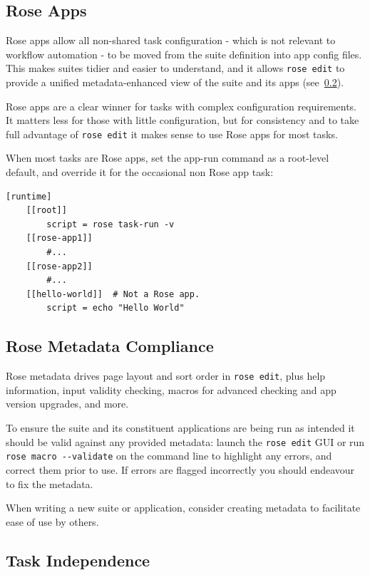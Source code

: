 \subsection{Rose Apps}

Rose apps allow all non-shared task configuration - which is not relevant to
workflow automation - to be moved from the suite definition into app config
files. This makes suites tidier and easier to understand, and it allows
\lstinline=rose edit= to provide a unified metadata-enhanced view of the suite
and its apps (see~\ref{Rose Metadata Compliance}).

Rose apps are a clear winner for tasks with complex configuration requirements.
It matters less for those with little configuration, but for consistency and to
take full advantage of \lstinline=rose edit= it makes sense to use Rose apps
for most tasks.

When most tasks are Rose apps, set the app-run command as a root-level default,
and override it for the occasional non Rose app task:

\lstset{language=suiterc}
\begin{lstlisting}
[runtime]
    [[root]]
        script = rose task-run -v
    [[rose-app1]]
        #...
    [[rose-app2]]
        #...
    [[hello-world]]  # Not a Rose app.
        script = echo "Hello World"
\end{lstlisting}

\subsection{Rose Metadata Compliance}
\label{Rose Metadata Compliance}
 
Rose metadata drives page layout and sort order in \lstinline=rose edit=, plus
help information, input validity checking, macros for advanced checking and app
version upgrades, and more.

To ensure the suite and its constituent applications are being run as intended
it should be valid against any provided metadata: launch the
\lstinline=rose edit= GUI or run \lstinline=rose macro --validate= on the
command line to highlight any errors, and correct them prior to use. If errors
are flagged incorrectly you should endeavour to fix the metadata.

When writing a new suite or application, consider creating metadata to
facilitate ease of use by others.

\subsection{Task Independence}

